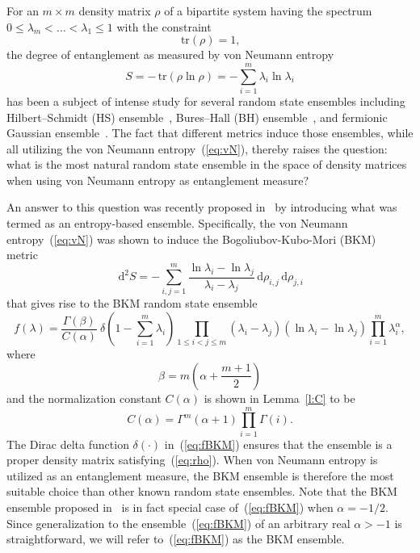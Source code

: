 \documentclass[pdflatex,sn-mathphys-num]{sn-jnl}%
\theoremstyle{thmstyleone}
\newcommand{\dd}{\,\mathrm{d}}
\newcommand{\tr}{\,\mathrm{tr}}
\begin{document}
For an $m\times m$ density matrix $\rho$ of a bipartite system having the spectrum $0\leq\lambda_{m}<\dots<\lambda_{1}\leq1$ with the constraint
\begin{equation}\label{eq:rho}
\tr(\rho)=1,
\end{equation}
the degree of entanglement as measured by von Neumann entropy
\begin{equation}\label{eq:vN}
S=-\tr\left(\rho\ln\rho\right)=-\sum_{i=1}^{m}\lambda_{i}\ln\lambda_{i}
\end{equation}
has been a subject of intense study for several random state ensembles including Hilbert–Schmidt (HS) ensemble~\cite{Page93,Foong94,Ruiz95,VPO16,Wei17,Wei20,HWC21,HW25}, Bures–Hall (BH) ensemble~\cite{Sommers03,Forrester16,Kumar19,Wei20BHA,Wei20BH,WHW25,WHW26}, and fermionic Gaussian ensemble~\cite{Bianchi21,HW22,HW23}. The fact that different metrics induce those ensembles, while all utilizing the von Neumann entropy~(\ref{eq:vN}), thereby raises the question: what is the most natural random state ensemble in the space of density matrices when using von Neumann entropy as entanglement measure?

An answer to this question was recently proposed in~\cite{Miller25} by introducing what was termed as an entropy-based ensemble. Specifically, the von Neumann entropy~(\ref{eq:vN}) was shown to induce the Bogoliubov-Kubo-Mori (BKM) metric~\cite{Balian86,Balian14}
\begin{equation}
\dd^{2}S=-\sum_{i,j=1}^{m}\frac{\ln\lambda_{i}-\ln\lambda_{j}}{\lambda_{i}-\lambda_{j}}\dd\rho_{i,j}\dd\rho_{j,i}
\end{equation}
that gives rise to the BKM random state ensemble~\cite{Miller25}
\begin{equation}\label{eq:fBKM}
f(\lambda)=\frac{\Gamma(\beta)}{C(\alpha)}~\delta\left(1-\sum_{i=1}^{m}\lambda_{i}\right)\prod_{1\leq i<j\leq m}\left(\lambda_{i}-\lambda_{j}\right)\left(\ln\lambda_{i}-\ln\lambda_{j}\right)\prod_{i=1}^{m}\lambda_{i}^{\alpha},
\end{equation}
where
\begin{equation}\label{eq:b}
\beta=m\left(\alpha+\frac{m+1}{2}\right)
\end{equation}
and the normalization constant $C(\alpha)$ is shown in Lemma~\ref{l:C} to be
\begin{equation}\label{eq:C}
C(\alpha)=\Gamma^{m}(\alpha+1)\prod_{i=1}^{m}\Gamma(i).
\end{equation}
The Dirac delta function $\delta(\cdot)$ in~(\ref{eq:fBKM}) ensures that the ensemble is a proper density matrix satisfying~(\ref{eq:rho}). When von Neumann entropy is utilized as an entanglement measure, the BKM ensemble is therefore the most suitable choice than other known random state ensembles. Note that the BKM ensemble proposed in~\cite{Miller25} is in fact special case of~(\ref{eq:fBKM}) when $\alpha=-1/2$. Since generalization to the ensemble~(\ref{eq:fBKM}) of an arbitrary real $\alpha>-1$ is straightforward, we will refer to~(\ref{eq:fBKM}) as the BKM ensemble.
\end{document}

